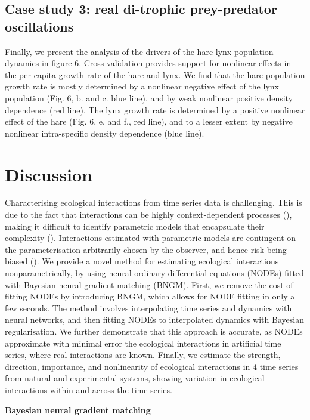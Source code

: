 \documentclass[11pt, oneside]{article}
\begin{document}
\subsection{Case study 3: real di-trophic prey-predator oscillations}

Finally, we present the analysis of the drivers of the hare-lynx population dynamics in figure 6.
Cross-validation provides support for nonlinear effects in the per-capita growth rate of the hare and lynx.
We find that the hare population growth rate is mostly determined by a nonlinear negative effect of the lynx population (Fig. 6, b. and c. blue line), and by weak nonlinear positive density dependence (red line). 
The lynx growth rate is determined by a positive nonlinear effect of the hare (Fig. 6, e. and f., red line), and to a lesser extent by negative nonlinear intra-specific density dependence (blue line).

\section{Discussion}

Characterising ecological interactions from time series data is challenging.
This is due to the fact that interactions can be highly context-dependent processes (\cite{Song2021}), making it difficult to identify parametric models that encapsulate their complexity (\cite{Wood2001}).
Interactions estimated with parametric models are contingent on the parameterisation arbitrarily chosen by the observer, and hence risk being biased (\cite{Wood2001,Adamson2013}).
We provide a novel method for estimating ecological interactions nonparametrically, by using neural ordinary differential equations (NODEs) fitted with Bayesian neural gradient matching (BNGM). 
First, we remove the cost of fitting NODEs by introducing BNGM, which allows for NODE fitting in only a few seconds. 
The method involves interpolating time series and dynamics with neural networks, and then fitting NODEs to interpolated dynamics with Bayesian regularisation.
We further demonstrate that this approach is accurate, as NODEs approximate with minimal error the ecological interactions in artificial time series, where real interactions are known. 
Finally, we estimate the strength, direction, importance, and nonlinearity of ecological interactions in 4 time series from natural and experimental systems, showing variation in ecological interactions within and across the time series.

\textbf{Bayesian neural gradient matching}
\end{document}

